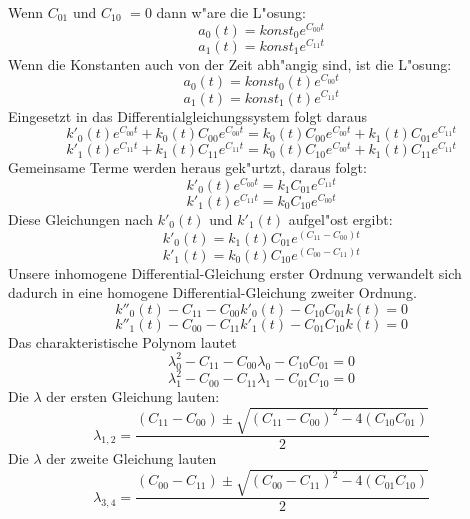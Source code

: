 \begin{refsection}
Wenn $ C_{01}$ und $ C_{10}$ $ =0$ dann w"are die L"osung:\\
\[
\ a_{0}(t) = konst_{0} e^{C_{00} t} 
\]
\[
\ a_{1}(t) = konst_{1} e^{C_{11} t}
\]
Wenn die Konstanten auch von der Zeit abh"angig sind, ist die L"osung: \\
\[
\ a_{0}(t) = konst_{0}(t) e^{C_{00} t} 
\]
\[
\ a_{1}(t) = konst_{1}(t) e^{C_{11} t} 
\]
Eingesetzt in das Differentialgleichungssystem folgt daraus\\
\[
\ k'_{0}(t) e^{C_{00} t} + k_{0}(t) C_{00} e^{C_{00} t} = k_{0}(t) C_{00} e^{C_{00} t} + k_{1}(t)C_{01}e^{C_{11} t}
\]
\[
\ k'_{1}(t) e^{C_{11} t} + k_{1}(t) C_{11} e^{C_{11} t} = k_{0}(t) C_{10} e^{C_{00} t} + k_{1}(t)C_{11}e^{C_{11} t}
\]
Gemeinsame Terme werden heraus gek"urtzt, daraus folgt:\\
\[
\ k'_{0}(t) e^{C_{00} t} = k_{1} C_{01} e^{C_{11} t}
\]
\[
\ k'_{1}(t) e^{C_{11} t} = k_{0} C_{10} e^{C_{00} t}
\]
Diese Gleichungen nach $ k'_{0}(t)$ und $ k'_{1}(t)$ aufgel"ost ergibt:\\
\[
\ k'_{0}(t) = k_{1}(t) C_{01} e^{(C_{11}-C_{00}) t}
\]
\[
\ k'_{1}(t) = k_{0}(t) C_{10} e^{(C_{00}-C_{11}) t}
\]
Unsere inhomogene Differential-Gleichung erster Ordnung verwandelt sich dadurch in eine homogene Differential-Gleichung zweiter Ordnung.\\
\[ 
\ k''_{0}(t) - C_{11}-C_{00} k'_{0}(t) - C_{10}C_{01}k(t) = 0
\]
\[
\ k''_{1}(t) - C_{00}-C_{11} k'_{1}(t) - C_{01}C_{10}k(t) = 0
\]
Das charakteristische Polynom lautet\\
\[
\ \lambda_{0}^{2} - C_{11}-C_{00}\lambda_{0} - C_{10}C_{01} = 0
\]
\[
\ \lambda_{1}^{2} - C_{00}-C_{11}\lambda_{1} - C_{01}C_{10} = 0
\]
Die $ \lambda $ der ersten Gleichung lauten:
\[
\ \lambda_{1,2} = \frac{(C_{11}-C_{00})\pm \sqrt{(C_{11}-C_{00})^2-4(C_{10}C_{01})}}{2}
\]
Die $ \lambda $ der zweite Gleichung lauten
\[
\ \lambda_{3,4} = \frac{(C_{00}-C_{11})\pm \sqrt{(C_{00}-C_{11})^2-4(C_{01}C_{10})}}{2}
\]

\printbibliography[heading=subbibliography]
\end{refsection}

